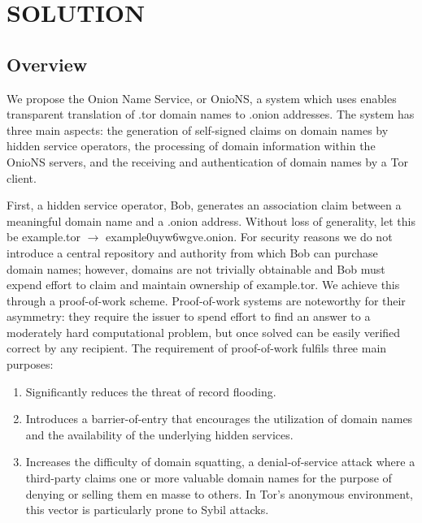 
\chapter{SOLUTION}



\section{Overview}

We propose the Onion Name Service, or OnioNS, a system which uses enables transparent translation of .tor domain names to .onion addresses. The system has three main aspects: the generation of self-signed claims on domain names by hidden service operators, the processing of domain information within the OnioNS servers, and the receiving and authentication of domain names by a Tor client.

First, a hidden service operator, Bob, generates an association claim between a meaningful domain name and a .onion address. Without loss of generality, let this be example.tor $ \rightarrow $ example0uyw6wgve.onion. For security reasons we do not introduce a central repository and authority from which Bob can purchase domain names; however, domains are not trivially obtainable and Bob must expend effort to claim and maintain ownership of example.tor. We achieve this through a proof-of-work scheme. Proof-of-work systems are noteworthy for their asymmetry: they require the issuer to spend effort to find an answer to a moderately hard computational problem, but once solved can be easily verified correct by any recipient. The requirement of proof-of-work fulfils three main purposes:

\begin{enumerate}
	\item Significantly reduces the threat of record flooding.
	\item Introduces a barrier-of-entry that encourages the utilization of domain names and the availability of the underlying hidden services.
	\item Increases the difficulty of domain squatting, a denial-of-service attack where a third-party claims one or more valuable domain names for the purpose of denying or selling them en masse to others. In Tor's anonymous environment, this vector is particularly prone to Sybil attacks.
\end{enumerate}


